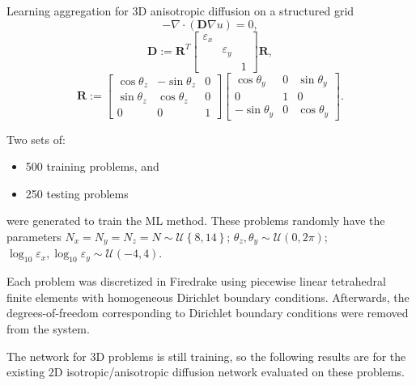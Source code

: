 \documentclass{article}
\newcommand{\mat}[1]{\bm{{#1}}}
\newcommand{\grad}{\nabla}
\begin{document}

Learning aggregation for 3D anisotropic diffusion on a structured grid
\begin{equation}
  -\grad \cdot \left(\mat{D} \grad u\right) = 0,
\end{equation}
\begin{equation}
  \mat{D} := \mat{R}^T\begin{bmatrix}\varepsilon_x & & \\ & \varepsilon_y & \\ & & 1 \end{bmatrix}\mat{R},
\end{equation}
\begin{equation}
  \mat{R} := \begin{bmatrix} \cos \theta_z & -\sin \theta_z & 0 \\ \sin \theta_z & \cos \theta_z & 0 \\ 0 & 0 & 1\end{bmatrix} \begin{bmatrix}\cos \theta_y & 0 & \sin \theta_y \\ 0 & 1 & 0 \\ -\sin\theta_y & 0 & \cos\theta_y \end{bmatrix}.
\end{equation}

Two sets of:
\begin{itemize}
\item 500 training problems, and
\item 250 testing problems
\end{itemize}
were generated to train the ML method.  These problems randomly have the parameters $N_x=N_y=N_z=N \sim \mathcal{U}\left\{8, 14\right\}$; $\theta_z, \theta_y \sim \mathcal{U}\left(0, 2\pi\right)$; $\log_{10}\varepsilon_x, \log_{10}\varepsilon_y \sim \mathcal{U}\left(-4, 4\right)$.

Each problem was discretized in Firedrake \cite{Firedrake} using piecewise linear tetrahedral finite elements with homogeneous Dirichlet boundary conditions.  Afterwards, the degrees-of-freedom corresponding to Dirichlet boundary conditions were removed from the system.

The network for 3D problems is still training, so the following results are for the existing 2D isotropic/anisotropic diffusion network evaluated on these problems.
\end{document}
